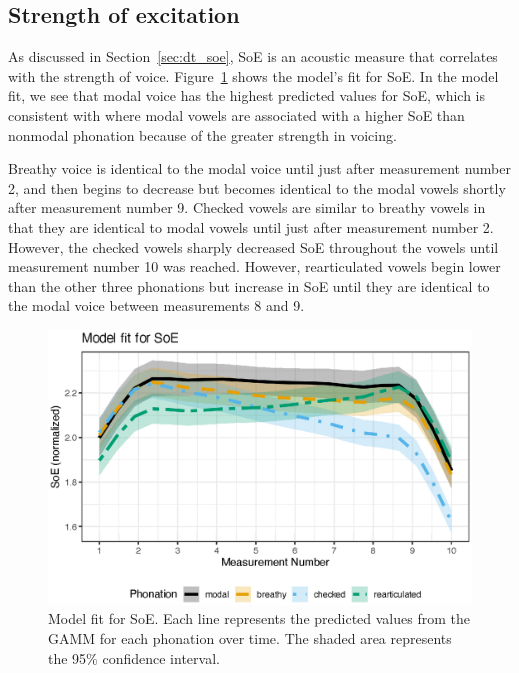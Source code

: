\subsection{Strength of excitation} \label{sec:model_soe}

As discussed in Section~\ref{sec:dt_soe}, SoE is an acoustic measure that correlates with the strength of voice. Figure~\ref{fig:soe_model_fit} shows the model's fit for SoE. In the model fit, we see that modal voice has the highest predicted values for SoE, which is consistent with \citet{garellekVoicingGlottalConsonants2021} where modal vowels are associated with a higher SoE than nonmodal phonation because of the greater strength in voicing. 

Breathy voice is identical to the modal voice until just after measurement number 2, and then begins to decrease but becomes identical to the modal vowels shortly after measurement number 9. Checked vowels are similar to breathy vowels in that they are identical to modal vowels until just after measurement number 2. However, the checked vowels sharply decreased SoE throughout the vowels until measurement number 10 was reached. However, rearticulated vowels begin lower than the other three phonations but increase in SoE until they are identical to the modal voice between measurements 8 and 9. 

\begin{figure}[h!]
    \centering
    \includegraphics[width = \linewidth]{images/LCH_GAMMs/soe_model_fit.eps}
    \caption{Model fit for SoE. Each line represents the predicted values from the GAMM for each phonation over time. The shaded area represents the 95\% confidence interval.}
    \label{fig:soe_model_fit}
\end{figure}

